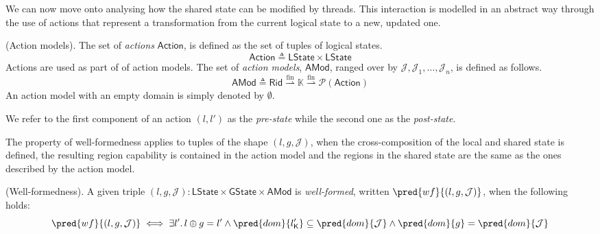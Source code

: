 We can now move onto analysing how the shared state can be modified by threads. This interaction is modelled in an abstract way through the use of actions that represent a transformation from the current logical state to a new, updated one.
\begin{defn}
	(Action models).
	The set of \emph{actions} $\mathsf{Action}$, is defined as the set of tuples of logical states.
	\[
		\mathsf{Action} \triangleq \mathsf{LState} \times \mathsf{LState}
	\]
	Actions are used as part of of action models. The set of \emph{action models}, $\mathsf{AMod}$, ranged over by $\mathcal{J}, \mathcal{J}_1, \ldots, \mathcal{J}_n$, is defined as follows.
	\[
		\mathsf{AMod} \triangleq \mathsf{Rid} \overset{\text{fin}}{\rightharpoonup} \mathbb{K} \overset{\text{fin}}{\rightharpoonup} \mathcal{P}(\mathsf{Action})
	\]
	An action model with an empty domain is simply denoted by $\emptyset$.
\end{defn}
We refer to the first component of an action $(l, l')$ as the \emph{pre-state} while the second one as the \emph{post-state}. 

The property of well-formedness applies to tuples of the shape $(l, g, \mathcal{J})$, when the cross-composition of the local and shared state is defined, the resulting region capability is contained in the action model and the regions in the shared state are the same as the ones described by the action model.
\begin{defn}
	(Well-formedness).
	A given triple $(l, g, \mathcal{J}) : \mathsf{LState} \times \mathsf{GState} \times \mathsf{AMod}$ is \emph{well-formed}, written $\pred{wf}{(l, g, \mathcal{J})}$, when the following holds:
	\[
		\pred{wf}{(l, g, \mathcal{J})} \iff \exists l' \ldotp l \oplus g = l' \land \pred{dom}{l'_\mathsf{K}} \subseteq \pred{dom}{\mathcal{J}} \land \pred{dom}{g} = \pred{dom}{\mathcal{J}}
	\]
\end{defn}

